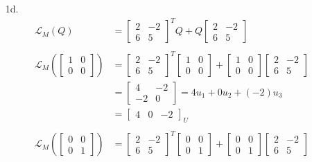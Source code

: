 \documentclass[12pt,fleqn,leqno,letterpaper]{article}
\begin{document}
\begin{enumerate}
		\item[1d.]
			\begin{align*}
				\mathcal{L}_{M}(Q) &= \begin{bmatrix} 2 & -2 \\ 6 & 5 \end{bmatrix}^{T}Q + Q \begin{bmatrix} 2 & -2 \\ 6 & 5 \end{bmatrix}\\\\
				\mathcal{L}_{M}\left(\begin{bmatrix} 1 & 0 \\ 0 & 0 \end{bmatrix}\right) &= \begin{bmatrix} 2 & -2 \\ 6 & 5 \end{bmatrix}^{T} \begin{bmatrix} 1 & 0 \\ 0 & 0 \end{bmatrix} + \begin{bmatrix} 1 & 0 \\ 0 & 0 \end{bmatrix} \begin{bmatrix} 2 & -2 \\ 6 & 5 \end{bmatrix}\\
				&= \begin{bmatrix} 4 & -2 \\ -2 & 0 \end{bmatrix} = 4 u_{1} + 0 u_{2} + (-2) u_{3}\\
				&= \begin{bmatrix} 4 & 0 & -2 \end{bmatrix}_{U}\\\\
				\mathcal{L}_{M}\left(\begin{bmatrix} 0 & 0 \\ 0 & 1 \end{bmatrix}\right) &= \begin{bmatrix} 2 & -2 \\ 6 & 5 \end{bmatrix}^{T} \begin{bmatrix} 0 & 0 \\ 0 & 1 \end{bmatrix} + \begin{bmatrix} 0 & 0 \\ 0 & 1 \end{bmatrix} \begin{bmatrix} 2 & -2 \\ 6 & 5 \end{bmatrix}\\

\end{align*}
\end{enumerate}
\end{document}

